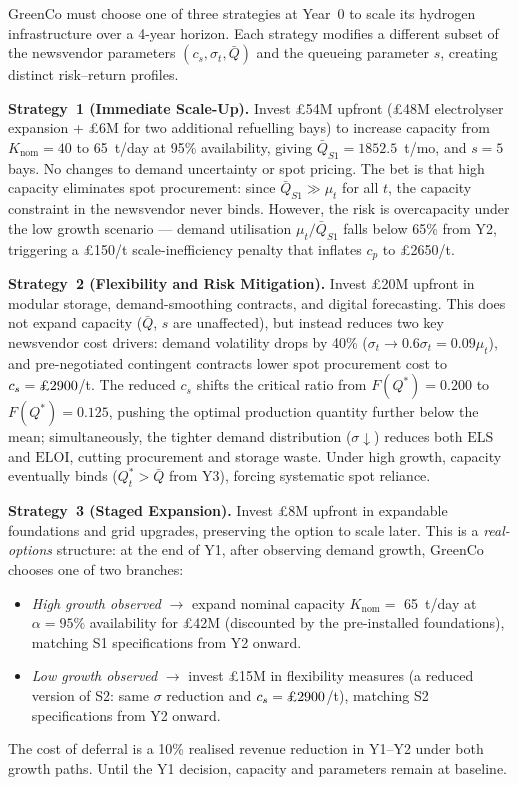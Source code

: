 \documentclass[10pt,a4paper]{article}
\begin{document}
GreenCo must choose one of three strategies at Year~0 to scale its hydrogen infrastructure over a 4-year horizon. Each strategy modifies a different subset of the newsvendor parameters $(c_s, \sigma_t, \bar{Q})$ and the queueing parameter $s$, creating distinct risk--return profiles.

\textbf{Strategy~1 (Immediate Scale-Up).} Invest \pounds54M upfront (\pounds48M electrolyser expansion + \pounds6M for two additional refuelling bays) to increase capacity from $K_\mathrm{nom} = 40$ to 65~t/day at 95\% availability, giving $\bar{Q}_{S1} = 1852.5$~t/mo, and $s = 5$ bays. No changes to demand uncertainty or spot pricing. The bet is that high capacity eliminates spot procurement: since $\bar{Q}_{S1} \gg \mu_t$ for all $t$, the capacity constraint in the newsvendor never binds. However, the risk is overcapacity under the low growth scenario --- demand utilisation $\mu_t/\bar{Q}_{S1}$ falls below 65\% from Y2, triggering a \pounds150/t scale-inefficiency penalty that inflates $c_p$ to \pounds2650/t.

\textbf{Strategy~2 (Flexibility and Risk Mitigation).} Invest \pounds20M upfront in modular storage, demand-smoothing contracts, and digital forecasting. This does not expand capacity ($\bar{Q}$, $s$ are unaffected), but instead reduces two key newsvendor cost drivers: demand volatility drops by 40\% ($\sigma_t \to 0.6\sigma_t = 0.09\mu_t$), and pre-negotiated contingent contracts lower spot procurement cost to $c_s = \text{\pounds}2900$/t. The reduced $c_s$ shifts the critical ratio from $F(Q^*) = 0.200$ to $F(Q^*) = 0.125$, pushing the optimal production quantity further below the mean; simultaneously, the tighter demand distribution ($\sigma \downarrow$) reduces both $\mathrm{ELS}$ and $\mathrm{ELOI}$, cutting procurement and storage waste. Under high growth, capacity eventually binds ($Q_t^* > \bar{Q}$ from Y3), forcing systematic spot reliance.

\textbf{Strategy~3 (Staged Expansion).} Invest \pounds8M upfront in expandable foundations and grid upgrades, preserving the option to scale later. This is a \textit{real-options} structure: at the end of Y1, after observing demand growth, GreenCo chooses one of two branches:
\begin{itemize}
    \item \textit{High growth observed} $\to$ expand nominal capacity $K_\mathrm{nom} = $ 65~t/day at $\alpha=95\%$ availability for \pounds42M (discounted by the pre-installed foundations), matching S1 specifications from Y2 onward.
    \item \textit{Low growth observed} $\to$ invest \pounds15M in flexibility measures (a reduced version of S2: same $\sigma$ reduction and $c_s = \text{\pounds}2900$/t), matching S2 specifications from Y2 onward.
\end{itemize}
The cost of deferral is a 10\% realised revenue reduction in Y1--Y2 under both growth paths. Until the Y1 decision, capacity and parameters remain at baseline.
\end{document}
